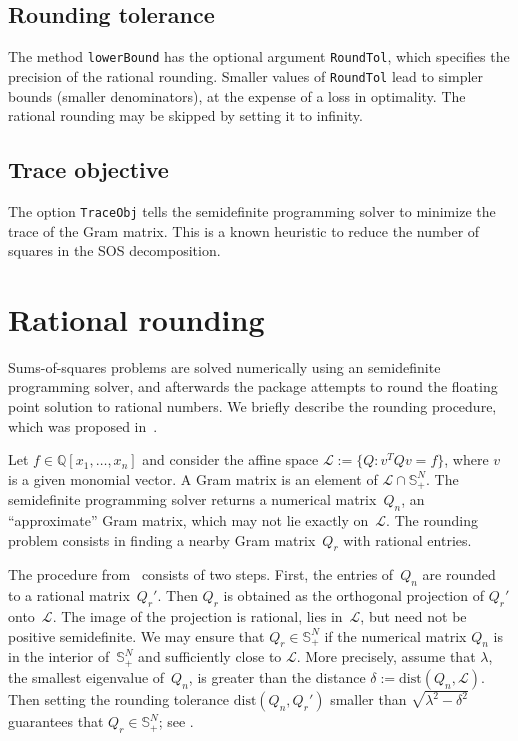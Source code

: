 \documentclass[11pt]{amsart}
\theoremstyle{plain}%
\theoremstyle{definition}
\theoremstyle{remark}
\newcommand{\QQ}{\mathbb{Q}}
\begin{document}
\subsection*{Rounding tolerance}
The method \verb|lowerBound| has the optional argument \verb|RoundTol|, which specifies the precision of the rational rounding.
Smaller values of \verb|RoundTol| lead to simpler bounds (smaller denominators), at the expense of a loss in optimality.
The rational rounding may be skipped by setting it to infinity.

\subsection*{Trace objective}
The option \verb|TraceObj| tells the semidefinite programming solver to minimize the trace of the Gram matrix.
This is a known heuristic to reduce the number of squares in the SOS decomposition.

\appendix

\section{Rational rounding}%
\label{sec:rounding}

Sums-of-squares problems are solved numerically using an semidefinite programming solver,
and afterwards the package attempts to round the floating point solution to rational numbers.
We briefly describe the rounding procedure, which was proposed in~\cite{peyrl2008computing}.

Let $f\in \QQ[x_1,\dots,x_n]$ and consider the affine space $\mathcal{L}:= \{Q: v^T\! Q v \!=\! f\}$, where $v$ is a given monomial vector.
A Gram matrix is an element of $\mathcal{L}\cap \mathbb{S}_+^N$.
The semidefinite programming solver returns a numerical matrix~$Q_n$, an ``approximate'' Gram matrix, which may not lie exactly on~$\mathcal{L}$.
The rounding problem consists in finding a nearby Gram matrix~$Q_r$ with rational entries.

The procedure from~\cite{peyrl2008computing} consists of two steps.
First, the entries of~$Q_n$ are rounded to a rational matrix~$Q_r'$.
Then $Q_r$ is obtained as the orthogonal projection of $Q_r'$ onto~$\mathcal{L}$.
The image of the projection is rational, lies in~$\mathcal{L}$, but need not be positive semidefinite.
We may ensure that $Q_r\in \mathbb{S}_+^N$ if the numerical matrix $Q_n$ is in the interior of~$\mathbb{S}_+^N$ and sufficiently close to $\mathcal{L}$.
More precisely, assume that $\lambda$, the smallest eigenvalue of~$Q_n$, is greater than the distance $\delta:= \textrm{dist}(Q_n,\mathcal{L})$.
Then setting the {rounding tolerance} $\textrm{dist}(Q_n,Q_r')$ smaller than $\sqrt{\lambda^2 - \delta^2}$ guarantees that $Q_r \in \mathbb{S}_+^N$; 
see \cite[Prop.~8]{peyrl2008computing}.
\end{document}

